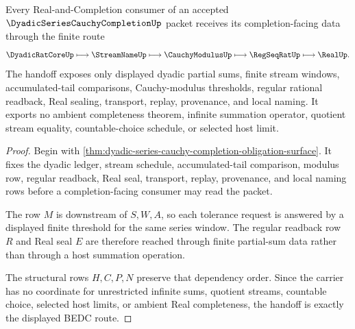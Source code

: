 \begin{theorem}
\label{thm:dyadic-series-cauchy-completion-handoff}
Every Real-and-Completion consumer of an accepted $\DyadicSeriesCauchyCompletionUp$ packet receives its completion-facing data through the finite route
$$
\DyadicRatCoreUp
\longmapsto
\StreamNameUp
\longmapsto
\CauchyModulusUp
\longmapsto
\RegSeqRatUp
\longmapsto
\RealUp .
$$
The handoff exposes only displayed dyadic partial sums, finite stream windows, accumulated-tail comparisons, Cauchy-modulus thresholds, regular rational readback, Real sealing, transport, replay, provenance, and local naming. It exports no ambient completeness theorem, infinite summation operator, quotient stream equality, countable-choice schedule, or selected host limit.
\end{theorem}
\begin{proof}
Begin with \autoref{thm:dyadic-series-cauchy-completion-obligation-surface}. It fixes the dyadic ledger, stream schedule, accumulated-tail comparison, modulus row, regular readback, Real seal, transport, replay, provenance, and local naming rows before a completion-facing consumer may read the packet.

The row $M$ is downstream of $S,W,A$, so each tolerance request is answered by a displayed finite threshold for the same series window. The regular readback row $R$ and Real seal $E$ are therefore reached through finite partial-sum data rather than through a host summation operation.

The structural rows $H,C,P,N$ preserve that dependency order. Since the carrier has no coordinate for unrestricted infinite sums, quotient streams, countable choice, selected host limits, or ambient Real completeness, the handoff is exactly the displayed BEDC route.
\end{proof}




